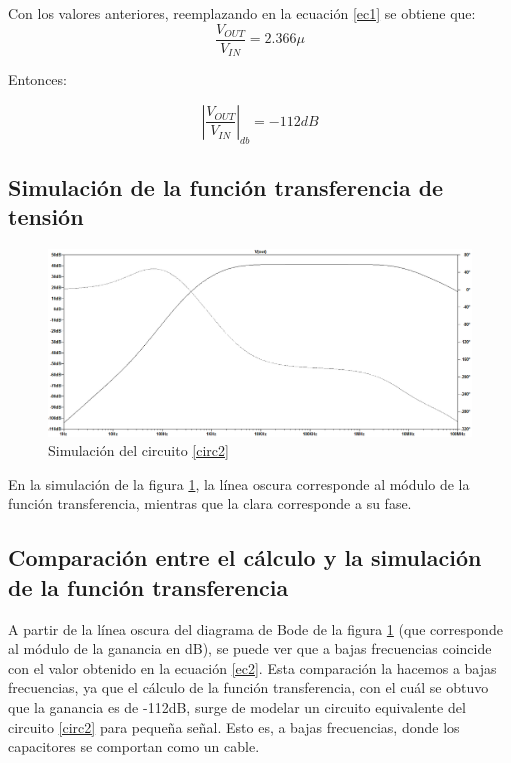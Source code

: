Con los valores anteriores, reemplazando en la ecuaci\'on \ref{ec1} se obtiene que:
$$ \frac{V_{OUT}}{V_{IN}} = 2.366\mu $$

Entonces:

\begin{equation} |\frac{V_{OUT}}{V_{IN}} |_{db} = -112 dB \label{ec2} \end{equation}

\subsection*{\color{orange} Simulaci\'on de la funci\'on transferencia de tensi\'on}


\begin{figure}[H] %
\centering
\includegraphics[scale=0.45]{../EJ2/rtaenfrec}
\caption{Simulaci\'on del circuito \ref{circ2}}
\label{simEj2}
\end{figure}

En la simulaci\'on de la figura \ref{simEj2}, la l\'inea oscura corresponde al m\'odulo de la funci\'on transferencia, mientras que la clara corresponde a su fase. 

\subsection*{\color{orange} Comparaci\'on entre el c\'alculo y la simulaci\'on de la funci\'on transferencia}

A partir de la l\'inea oscura del diagrama de Bode de la figura \ref{simEj2} (que corresponde al m\'odulo de la ganancia en dB), se puede ver que a bajas frecuencias coincide con  el valor obtenido en la ecuaci\'on \ref{ec2}. Esta comparaci\'on la hacemos a bajas frecuencias, ya que el c\'alculo de la funci\'on transferencia, con el cu\'al se obtuvo que la ganancia es de -112dB, surge de modelar un circuito equivalente del circuito \ref{circ2} para pequeña señal. Esto es, a bajas frecuencias, donde los capacitores se comportan como un cable.




















